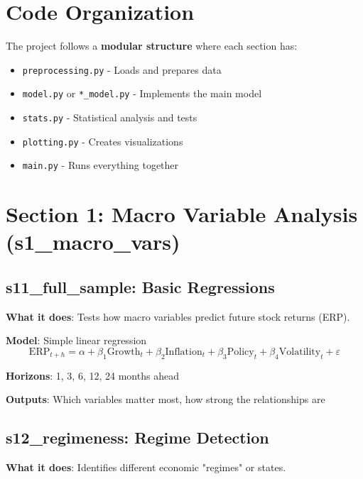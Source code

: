 \documentclass[11pt,a4paper]{article}
\begin{document}
\section{Code Organization}

The project follows a \textbf{modular structure} where each section has:
\begin{itemize}
    \item \texttt{preprocessing.py} - Loads and prepares data
    \item \texttt{model.py} or \texttt{*\_model.py} - Implements the main model
    \item \texttt{stats.py} - Statistical analysis and tests
    \item \texttt{plotting.py} - Creates visualizations
    \item \texttt{main.py} - Runs everything together
\end{itemize}

\section{Section 1: Macro Variable Analysis (s1\_macro\_vars)}

\subsection{s11\_full\_sample: Basic Regressions}
\textbf{What it does}: Tests how macro variables predict future stock returns (ERP).

\textbf{Model}: Simple linear regression
\[
\text{ERP}_{t+h} = \alpha + \beta_1 \text{Growth}_t + \beta_2 \text{Inflation}_t + \beta_3 \text{Policy}_t + \beta_4 \text{Volatility}_t + \varepsilon
\]

\textbf{Horizons}: 1, 3, 6, 12, 24 months ahead

\textbf{Outputs}: Which variables matter most, how strong the relationships are

\subsection{s12\_regimeness: Regime Detection}
\textbf{What it does}: Identifies different economic "regimes" or states.
\end{document}
